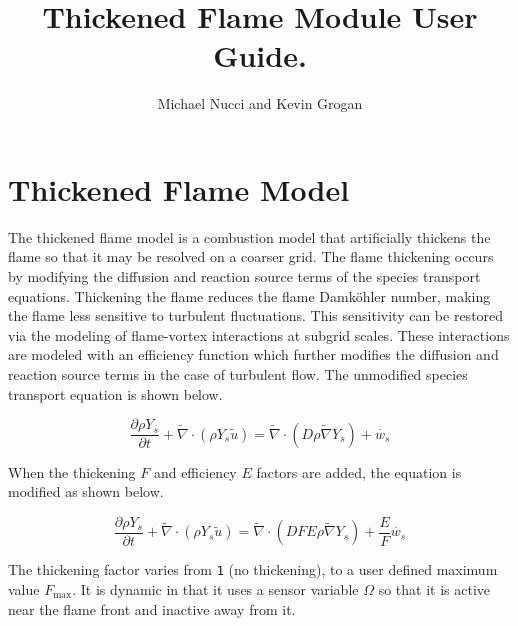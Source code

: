 \documentclass{article}
\begin{document}
\title{Thickened Flame Module User Guide.}

\author{ Michael Nucci and Kevin Grogan }

\maketitle
\section{Thickened Flame Model}

The thickened flame model \cite{Colin} is a combustion model that artificially thickens the flame so that it may be resolved on a coarser grid. The flame thickening occurs by modifying the diffusion and reaction source terms of the species transport equations. Thickening the flame reduces the flame Damk\"ohler number, making the flame less sensitive to turbulent fluctuations. This sensitivity can be restored via the modeling of flame-vortex interactions at subgrid scales. These interactions are modeled with an efficiency function which further modifies the diffusion and reaction source terms in the case of turbulent flow. The unmodified species transport equation is shown below.

\begin{equation}
\frac{\partial \rho Y_s}{\partial t} + \tilde{\nabla} \cdot \left( \rho Y_s \tilde{u} \right) = \tilde{\nabla} \cdot \left( D \rho \tilde{\nabla} Y_s\right) + \dot{w_s} 
\end{equation}

When the thickening {\tt $F$} and efficiency {\tt $E$} factors are added, the equation is modified as shown below.

\begin{equation}
\frac{\partial \rho Y_s}{\partial t} + \tilde{\nabla} \cdot \left( \rho Y_s \tilde{u} \right) = \tilde{\nabla} \cdot \left( D F E \rho \tilde{\nabla} Y_s\right) + \frac{E}{F} \dot{w_s} 
\end{equation}

The thickening factor varies from {\tt 1} (no thickening), to a user defined maximum value {\tt $F_\mathrm{max}$}. It is dynamic in that it uses a sensor variable {\tt $\Omega$} so that it is active near the flame front and inactive away from it. 
\end{document}
